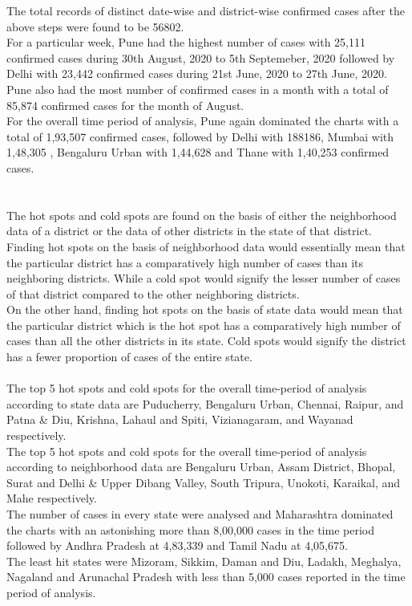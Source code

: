 \documentclass{article}
\begin{document}
The total records of distinct date-wise and district-wise confirmed cases after the above steps were found to be 56802.\\
For a particular week, Pune had the highest number of cases with 25,111 confirmed cases during 30th August, 2020 to 5th Septemeber, 2020 followed by Delhi with 23,442 confirmed cases during 21st June, 2020 to 27th June, 2020.\\
Pune also had the most number of confirmed cases in a month with a total of 85,874 confirmed cases for the month of August.\\
For the overall time period of analysis, Pune again dominated the charts with a total of 1,93,507 confirmed cases, followed by Delhi with 188186, Mumbai with 1,48,305 , Bengaluru Urban with 1,44,628 and Thane with 1,40,253 confirmed cases.\\
\\
\\
The hot spots and cold spots are found on the basis of either the neighborhood data of a district or the data of other districts in the state of that district. \\
Finding hot spots on the basis of neighborhood data would essentially mean that the particular district has a comparatively high number of cases than its neighboring districts. While a cold spot would signify the lesser number of cases of that district compared to the other neighboring districts.\\
On the other hand, finding hot spots on the basis of state data would mean that the particular district which is the hot spot has a comparatively high number of cases than all the other districts in its state. Cold spots would signify the district has a fewer proportion of cases of the entire state.\\ \\
The top 5 hot spots and cold spots for the overall time-period of analysis according to state data are Puducherry, Bengaluru Urban, Chennai, Raipur, and Patna \& Diu, Krishna, Lahaul and Spiti, Vizianagaram, and Wayanad respectively. \\

The top 5 hot spots and cold spots for the overall time-period of analysis according to neighborhood data are Bengaluru Urban, Assam District, Bhopal, Surat and Delhi \& Upper Dibang Valley, South Tripura, Unokoti, Karaikal, and Mahe respectively.\\

The number of cases in every state were analysed and Maharashtra dominated the charts with an astonishing more than 8,00,000 cases in the time period followed by Andhra Pradesh at 4,83,339 and Tamil Nadu at 4,05,675. \\
The least hit states were Mizoram, Sikkim, Daman and Diu, Ladakh, Meghalya, Nagaland and Arunachal Pradesh with less than 5,000 cases reported in the time period of analysis. \\
\end{document}
